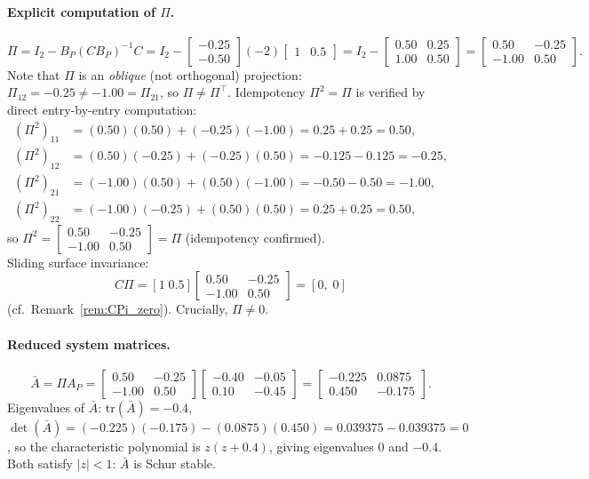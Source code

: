 \documentclass[10pt]{amsart}
\numberwithin{equation}{section}
\begin{document}
\paragraph{Explicit computation of $\Pi$.}
\[
\Pi = I_2 - B_P(CB_P)^{-1}C
    = I_2 - \begin{bmatrix}-0.25\\-0.50\end{bmatrix}(-2)\begin{bmatrix}1&0.5\end{bmatrix}
    = I_2 - \begin{bmatrix}0.50&0.25\\1.00&0.50\end{bmatrix}
    = \begin{bmatrix}0.50&-0.25\\-1.00&0.50\end{bmatrix}.
\]
Note that $\Pi$ is an \emph{oblique} (not orthogonal) projection: $\Pi_{12} = -0.25
\neq -1.00 = \Pi_{21}$, so $\Pi \neq \Pi^\top$. Idempotency $\Pi^2 = \Pi$ is verified
by direct entry-by-entry computation:
\begin{align*}
(\Pi^2)_{11} &= (0.50)(0.50) + (-0.25)(-1.00) = 0.25 + 0.25 = 0.50,\\
(\Pi^2)_{12} &= (0.50)(-0.25) + (-0.25)(0.50) = -0.125 - 0.125 = -0.25,\\
(\Pi^2)_{21} &= (-1.00)(0.50) + (0.50)(-1.00) = -0.50 - 0.50 = -1.00,\\
(\Pi^2)_{22} &= (-1.00)(-0.25) + (0.50)(0.50) = 0.25 + 0.25 = 0.50,
\end{align*}
so $\Pi^2 = \begin{bmatrix}0.50&-0.25\\-1.00&0.50\end{bmatrix} = \Pi$ \quad
(idempotency confirmed).\\[4pt]
Sliding surface invariance:
\[
C\Pi = [1\;0.5]\begin{bmatrix}0.50&-0.25\\-1.00&0.50\end{bmatrix}
     = [0,\; 0]
\]
(cf.\ Remark~\ref{rem:CPi_zero}). Crucially, $\Pi \neq 0$.

\paragraph{Reduced system matrices.}
\[
\bar{A} = \Pi A_P = \begin{bmatrix}0.50&-0.25\\-1.00&0.50\end{bmatrix}
\begin{bmatrix}-0.40&-0.05\\0.10&-0.45\end{bmatrix}
= \begin{bmatrix}-0.225 & 0.0875 \\ 0.450 & -0.175\end{bmatrix}.
\]
Eigenvalues of $\bar{A}$: $\mathrm{tr}(\bar{A})=-0.4$,
$\det(\bar{A})=(-0.225)(-0.175)-(0.0875)(0.450)
= 0.039375 - 0.039375 = 0$, so the characteristic polynomial is $z(z+0.4)$, giving
eigenvalues $0$ and $-0.4$. Both satisfy $|z|<1$: $\bar{A}$ is Schur stable.
\end{document}
